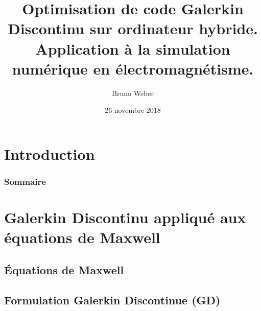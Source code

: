 \documentclass[
	10pt,
]{beamer}
\title[Soutenance de thèse]{Optimisation de code Galerkin Discontinu sur ordinateur hybride. Application à la simulation numérique en électromagnétisme.} %
\author{Bruno Weber} %
\institute[IRMA] %
{
Université de Strasbourg \\ %
\medskip
\textit{bweber@math.unistra.fr\\bruno.weber@axessim.fr} %
}
\date{26 novembre 2018} %
\begin{document}


\section*{Introduction}





\begin{frame}
\frametitle{Sommaire} %
\tableofcontents %
\end{frame}


\section{Galerkin Discontinu appliqué aux équations de Maxwell}
\subsection*{Équations de Maxwell}


\subsection*{Formulation Galerkin Discontinue (GD)}
\end{document}
